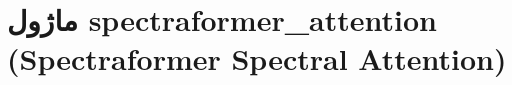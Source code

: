 \section{ماژول spectraformer\_attention (Spectraformer Spectral Attention)}
\label{sec:module_spectraformer_attention}
